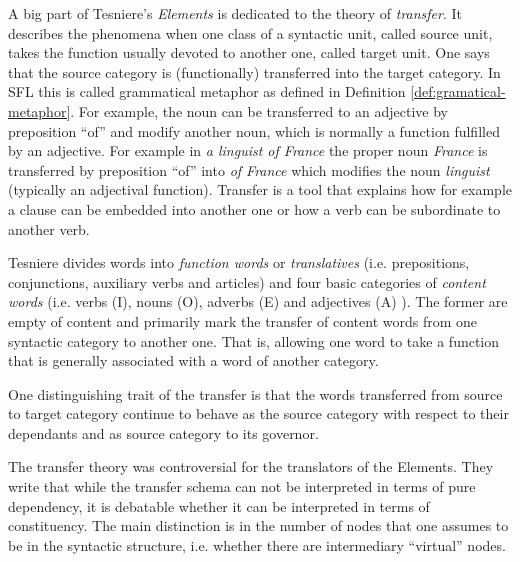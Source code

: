     
    A big part of Tesniere's \textit{Elements} \citep{Tesniere59} is dedicated to the theory of \textit{transfer}. It describes the phenomena when one class of a syntactic unit, called source unit, takes the function  usually devoted to another one, called target unit. One says that the source category is (functionally) transferred into the target category. In SFL this is called grammatical metaphor as defined in Definition \ref{def:gramatical-metaphor}. For example, the noun can be transferred to an adjective by preposition ``of'' and modify another noun, which is normally a function fulfilled by an adjective. For example in \textit{a linguist of France} the proper noun \textit{France} is transferred by preposition ``of'' into \textit{of France} which modifies the noun \textit{linguist} (typically an adjectival function). Transfer is a tool that explains how for example a clause can be embedded into another one or how a verb can be subordinate to another verb. 

    Tesniere divides words into \textit{function words} or \textit{translatives} (i.e. prepositions, conjunctions, auxiliary verbs and articles) and four basic categories of \textit{content words} (i.e. verbs (I), nouns (O), adverbs (E) and adjectives (A) ). The former are empty of content and primarily mark the transfer of content words from one syntactic category to another one. That is, allowing one word to take a function that is generally associated with a word of another category.
    
    One distinguishing trait of the transfer is that the words transferred from source to target category continue to behave as the source category with respect to their dependants and as source category to its governor.

    The transfer theory was controversial for the translators of the Elements. They write \citep[liv-lx]{Tesniere2015} that while the transfer schema can not be interpreted in terms of pure dependency, it is debatable whether it can be interpreted in terms of constituency. The main distinction is in the number of nodes that one assumes to be in the syntactic structure, i.e. whether there are intermediary ``virtual'' nodes. 

